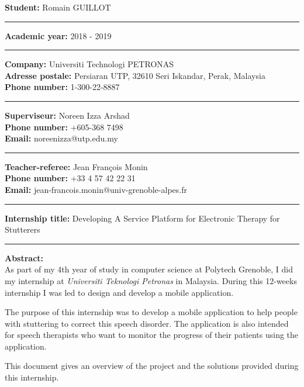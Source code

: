 
\clearpage \ifodd\value{page}\hbox{\thispagestyle{empty}}\newpage\fi
\thispagestyle{empty}

\noindent\textbf{Student:} Romain GUILLOT

\noindent\rule{\textwidth}{1pt}

\noindent\textbf{Academic year:} 2018 - 2019

\noindent\rule{\textwidth}{1pt}

\noindent\textbf{Company:} Universiti Technologi PETRONAS \\
\noindent\textbf{Adresse postale:} Persiaran UTP, 32610 Seri Iskandar, Perak, Malaysia \\
\noindent\textbf{Phone number:} 1-300-22-8887


\noindent\rule{\textwidth}{1pt}

\noindent\textbf{Superviseur:} Noreen Izza Arshad \\
\noindent\textbf{Phone number:} +605-368 7498 \\
\noindent\textbf{Email:} noreenizza@utp.edu.my

\noindent\rule{\textwidth}{1pt}

\noindent\textbf{Teacher-referee:} Jean François Monin\\
\noindent\textbf{Phone number:} +33 4 57 42 22 31   \\
\noindent\textbf{Email:} jean-francois.monin@univ-grenoble-alpes.fr

\noindent\rule{\textwidth}{1pt}

\noindent\textbf{Internship title:} Developing A Service Platform for Electronic Therapy for Stutterers

\noindent\rule{\textwidth}{1pt}

\noindent\textbf{Abstract:}\\
As part of my 4th year of study in computer science at Polytech Grenoble, I did my internship at \textit{Universiti Teknologi Petronas} in Malaysia. During this 12-weeks internship I was led to design and develop a mobile application.

The purpose of this internship was to develop a mobile application to help people with stuttering to correct this speech disorder. The application is also intended for speech therapists who want to monitor the progress of their patients using the application.

This document gives an overview of the project and the solutions provided during this internship.
